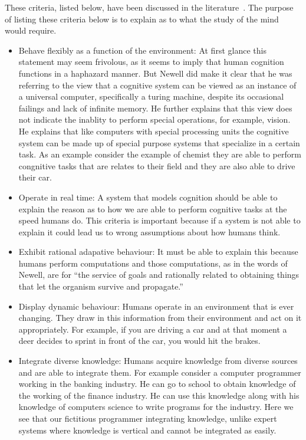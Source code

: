 These criteria, listed below, have been discussed in the
literature~\cite{CambridgeJournals:207162,Newell:1990aa}. The purpose
of listing these criteria below is to explain as to what the study of
the mind would require.

\begin{itemize} 


\item Behave flexibly as a function of the environment: At first
glance this statement may seem frivolous, as it seems to imply that
human cognition functions in a haphazard manner. But Newell did make it clear
that he was referring to the view that a cognitive system can be
viewed as an instance of a universal computer, specifically a turing
machine, despite its occasional failings and lack of infinite
memory. He further explains that this view does not indicate the
inablity to perform special operations, for example, vision. He
explains that like computers with special processing units the
cognitive system can be made up of special purpose systems that
specialize in a certain task. As an example consider the example of
chemist they are able to perform congnitive tasks that are relates to
their field and they are also able to drive their car. 


\item Operate in real time: A system that models cognition should be
able to explain the reason as to how we are able to perform cognitive
tasks at the speed humans do. This criteria is important because if a
system is not able to explain it could lead us to wrong assumptions
about how humans think.


\item Exhibit rational adapative behaviour: It must be able to explain
this because humans perform computations and those computations, as in the words of
Newell\cite{Newell:1990aa}, are for ``the service of goals and
rationally related to obtaining things that let the organism survive
and propagate.''

\item Display dynamic behaviour: Humans operate in an
environment that is ever changing. They draw in this
information from their environment and act on it appropriately. For
example, if you are driving a car and at that moment a deer decides
to sprint in front of the car, you would hit the brakes. 


\item Integrate diverse knowledge: Humans acquire knowledge from
diverse sources and are able to integrate them. For example consider a
computer programmer working in the banking industry. He can go to
school to obtain knowledge of the working of the finance industry. He
can use this knowledge along with his knowledge of computers science
to write programs for the industry. Here we see that our fictitious
programmer integrating knowledge, unlike expert systems where
knowledge is vertical and cannot be integrated as easily.


\end{itemize}
